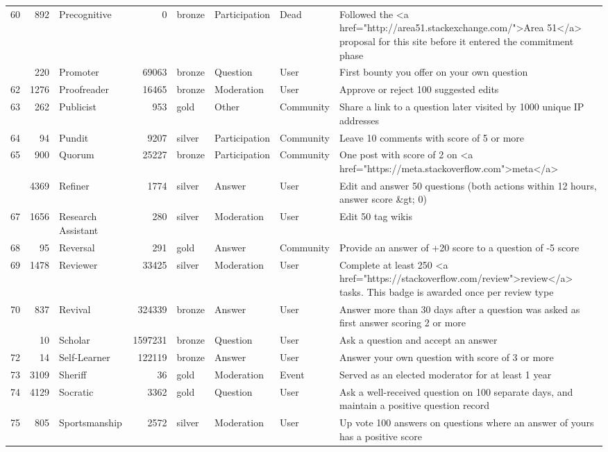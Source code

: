 \documentclass[]{book}
\theoremstyle{definition}
\theoremstyle{definition}
\theoremstyle{definition}
\theoremstyle{remark}
\begin{document}
\begin{landscape}
\begin{longtable}[t]{lr>{\raggedright\arraybackslash}p{2cm}rlll>{\raggedright\arraybackslash}p{10cm}}
60 & 892 & Precognitive & 0 & bronze & Participation & Dead & Followed the <a href="http://area51.stackexchange.com/">Area 51</a> proposal for this site before it entered the commitment phase\\
\addlinespace
61 & 220 & Promoter & 69063 & bronze & Question & User & First bounty you offer on your own question\\
62 & 1276 & Proofreader & 16465 & bronze & Moderation & User & Approve or reject 100 suggested edits\\
63 & 262 & Publicist & 953 & gold & Other & Community & Share a link to a question later visited by 1000 unique IP addresses\\
64 & 94 & Pundit & 9207 & silver & Participation & Community & Leave 10 comments with score of 5 or more\\
65 & 900 & Quorum & 25227 & bronze & Participation & Community & One post with score of 2 on <a href="https://meta.stackoverflow.com">meta</a>\\
\addlinespace
66 & 4369 & Refiner & 1774 & silver & Answer & User & Edit and answer 50 questions (both actions within 12 hours, answer score \&gt; 0)\\
67 & 1656 & Research Assistant & 280 & silver & Moderation & User & Edit 50 tag wikis\\
68 & 95 & Reversal & 291 & gold & Answer & Community & Provide an answer of +20 score to a question of -5 score\\
69 & 1478 & Reviewer & 33425 & silver & Moderation & User & Complete at least 250 <a href="https://stackoverflow.com/review">review</a> tasks. This badge is awarded once per review type\\
70 & 837 & Revival & 324339 & bronze & Answer & User & Answer more than 30 days after a question was asked as first answer scoring 2 or more\\
\addlinespace
71 & 10 & Scholar & 1597231 & bronze & Question & User & Ask a question and accept an answer\\
72 & 14 & Self-Learner & 122119 & bronze & Answer & User & Answer your own question with score of 3 or more\\
73 & 3109 & Sheriff & 36 & gold & Moderation & Event & Served as an elected moderator for at least 1 year\\
74 & 4129 & Socratic & 3362 & gold & Question & User & Ask a well-received question on 100 separate days, and maintain a positive question record\\
75 & 805 & Sportsmanship & 2572 & silver & Moderation & User & Up vote 100 answers on questions where an answer of yours has a positive score\\

\end{longtable}
\end{landscape}
\end{document}
